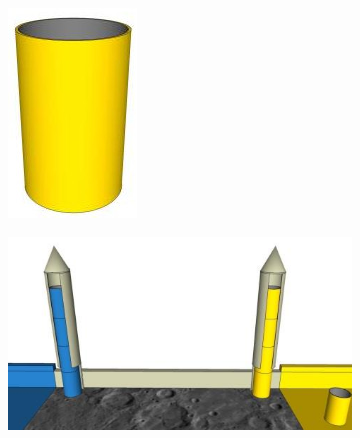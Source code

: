 \begin{frame}
\begin{figure}
\begin{subfigure}{0.1\textwidth}
		\end{subfigure}
		\hspace{1em}
		\begin{subfigure}{0.1\textwidth}
			\includegraphics[width=\textwidth]{../images/lunarModule.jpg}
		\end{subfigure}
		\hspace{2em}
		\begin{subfigure}{0.5\textwidth}
			\includegraphics[width=\textwidth]{../images/rockets.jpg}
		\end{subfigure}
	\end{figure}


\end{frame}
